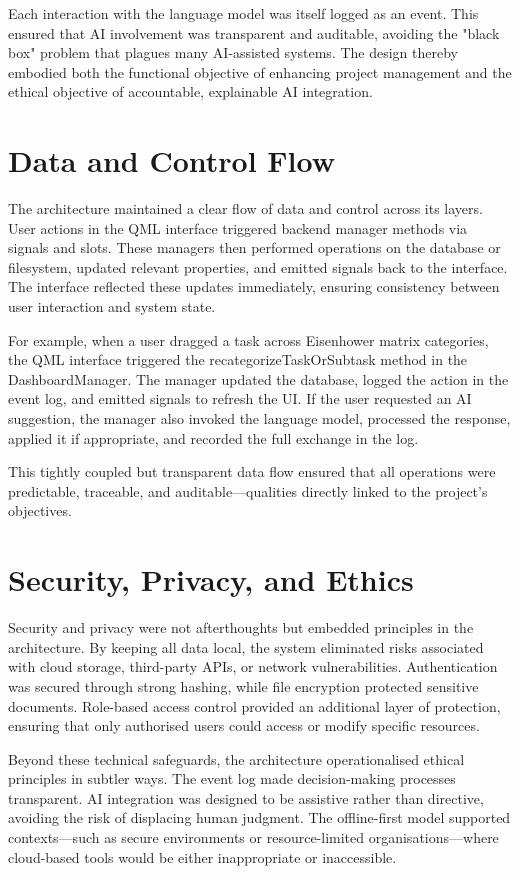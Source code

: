 \documentclass{report}
\begin{document}
Each interaction with the language model was itself logged as an event. 
This ensured that AI involvement was transparent and auditable, avoiding the "black box" problem that plagues many AI-assisted systems. 
The design thereby embodied both the functional objective of enhancing project management and the ethical objective of accountable, explainable AI integration.

\section{Data and Control Flow}

The architecture maintained a clear flow of data and control across its layers. 
User actions in the QML interface triggered backend manager methods via signals and slots. 
These managers then performed operations on the database or filesystem, updated relevant properties, and emitted signals back to the interface. 
The interface reflected these updates immediately, ensuring consistency between user interaction and system state.

For example, when a user dragged a task across Eisenhower matrix categories, the QML interface triggered the recategorizeTaskOrSubtask method in the DashboardManager. 
The manager updated the database, logged the action in the event log, and emitted signals to refresh the UI. 
If the user requested an AI suggestion, the manager also invoked the language model, processed the response, applied it if appropriate, and recorded the full exchange in the log.

This tightly coupled but transparent data flow ensured that all operations were predictable, traceable, and auditable—qualities directly linked to the project's objectives.

\section{Security, Privacy, and Ethics}

Security and privacy were not afterthoughts but embedded principles in the architecture. 
By keeping all data local, the system eliminated risks associated with cloud storage, third-party APIs, or network vulnerabilities. 
Authentication was secured through strong hashing, while file encryption protected sensitive documents. 
Role-based access control provided an additional layer of protection, ensuring that only authorised users could access or modify specific resources.

Beyond these technical safeguards, the architecture operationalised ethical principles in subtler ways. 
The event log made decision-making processes transparent. 
AI integration was designed to be assistive rather than directive, avoiding the risk of displacing human judgment. 
The offline-first model supported contexts—such as secure environments or resource-limited organisations—where cloud-based tools would be either inappropriate or inaccessible.
\end{document}
